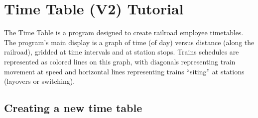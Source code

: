 
\chapter{Time Table (V2) Tutorial}
\label{chpt:tt:Tutorial}

 The Time Table is a program designed to
create railroad employee timetables.  The program's main display is a
graph of time (of day) versus distance (along the railroad), gridded at
time intervals and at station stops.  Trains schedules are represented
as colored lines on this graph, with diagonals representing train
movement at speed and horizontal lines representing trains ``siting''
at stations (layovers or switching).

\section{Creating a new time table}


